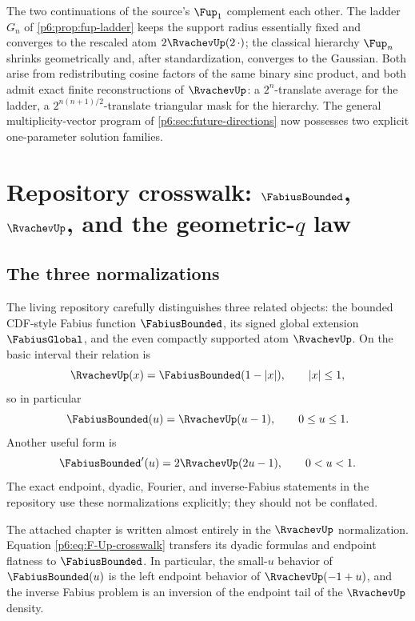 \documentclass[11pt,oneside]{article}
\numberwithin{equation}{section}
\theoremstyle{definition}
\theoremstyle{remark}
\begin{document}
\begin{novelbox}
The two continuations of the source's $\Fup_1$ complement each other.  The
ladder $G_n$ of \cref{p6:prop:fup-ladder} keeps the support radius essentially
fixed and converges to the rescaled atom $2\RvachevUp(2\,\cdot)$; the classical
hierarchy $\Fup_n$ shrinks geometrically and, after standardization, converges
to the Gaussian.  Both arise from redistributing cosine factors of the same
binary sinc product, and both admit exact finite reconstructions of $\RvachevUp$: a
$2^n$-translate average for the ladder, a $2^{n(n+1)/2}$-translate triangular
mask for the hierarchy.  The general multiplicity-vector program of
\cref{p6:sec:future-directions} now possesses two explicit one-parameter
solution families.
\end{novelbox}

\section{Repository crosswalk: \texorpdfstring{$\FabiusBounded$}{bounded Fabius}, \texorpdfstring{$\RvachevUp$}{up}, and the geometric-\texorpdfstring{$q$}{q} law}

\subsection{The three normalizations}

\begin{repobox}
The living repository carefully distinguishes three related objects: the bounded
CDF-style Fabius function $\FabiusBounded$, its signed global extension
$\FabiusGlobal$, and the
even compactly supported atom $\RvachevUp$.  On the basic interval their relation is
\begin{equation}\label{p6:eq:F-Up-crosswalk}
 \RvachevUp(x)=\FabiusBounded(1-|x|),\qquad |x|\le1,
\end{equation}
so in particular
\[
 \FabiusBounded(u)=\RvachevUp(u-1),\qquad 0\le u\le1.
\]
Another useful form is
\[
 \FabiusBounded'(u)=2\RvachevUp(2u-1),\qquad 0<u<1.
\]
The exact endpoint, dyadic, Fourier, and inverse-Fabius statements in the
repository use these normalizations explicitly; they should not be conflated.
\end{repobox}

The attached chapter is written almost entirely in the $\RvachevUp$ normalization.
Equation \eqref{p6:eq:F-Up-crosswalk} transfers its dyadic formulas and endpoint
flatness to $\FabiusBounded$.  In particular, the small-$u$ behavior of
$\FabiusBounded(u)$ is the left
endpoint behavior of $\RvachevUp(-1+u)$, and the inverse Fabius problem is an inversion
of the endpoint tail of the $\RvachevUp$ density.
\end{document}

